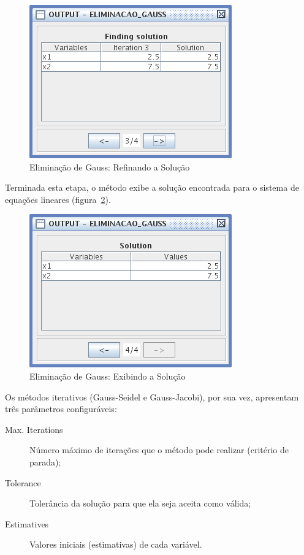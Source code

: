 \documentclass[a4paper,10pt]{report}
\begin{document}
\begin{figure}[ht]
 \centering
 \includegraphics[scale=0.8, bb=0 0 222 168]{screen-A-gauss-finding.png}
 \caption{Eliminação de Gauss: Refinando a Solução}
 \label{fig:elimfinding}
\end{figure}

Terminada esta etapa, o método exibe a solução encontrada para o sistema de equações lineares (figura~\ref{fig:elimsolution}).

\begin{figure}[ht]
 \centering
 \includegraphics[scale=0.8, bb=0 0 222 168]{screen-B-gauss-solution.png}
 \caption{Eliminação de Gauss: Exibindo a Solução}
 \label{fig:elimsolution}
\end{figure}

Os métodos iterativos (Gauss-Seidel e Gauss-Jacobi), por sua vez, apresentam três parâmetros configuráveis:

\begin{description}
 \item[Max. Iterations] Número máximo de iterações que o método pode realizar (critério de parada);
 \item[Tolerance] Tolerância da solução para que ela seja aceita como válida;
 \item[Estimatives] Valores iniciais (estimativas) de cada variável.
\end{description}
\end{document}
